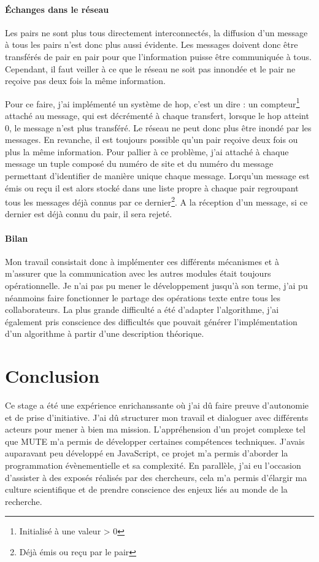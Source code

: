 \documentclass{tnreport}
\begin{document}
\subsubsection{Échanges dans le réseau}
Les pairs ne sont plus tous directement interconnectés, la diffusion d'un message à tous les pairs n'est donc plus aussi évidente. Les messages doivent donc être transférés de pair en pair pour que l'information puisse être communiquée à tous. Cependant, il faut veiller à ce que le réseau ne soit pas innondée et le pair ne reçoive pas deux fois la même information.

Pour ce faire, j'ai implémenté un système de hop, c'est un dire : un compteur\footnote{Initialisé à une valeur > 0} attaché au message, qui est décrémenté à chaque transfert, lorsque le hop atteint 0, le message n'est plus transféré. Le réseau ne peut donc plus être inondé par les messages. En revanche, il est toujours possible qu'un pair reçoive deux fois ou plus la même information. Pour pallier à ce problème, j'ai attaché à chaque message un tuple composé du numéro de site et du numéro du message permettant d'identifier de manière unique chaque message. Lorqu'un message est émis ou reçu il est alors stocké dans une liste propre à chaque pair regroupant tous les messages déjà connus par ce dernier\footnote{Déjà émis ou reçu par le pair}. A la réception d'un message, si ce dernier est déjà connu du pair, il sera rejeté. 

\subsubsection{Bilan}
Mon travail consistait donc à implémenter ces différents mécanismes et à m'assurer que la communication avec les autres modules était toujours opérationnelle. Je n'ai pas pu mener le développement jusqu'à son terme, j'ai pu néanmoins faire fonctionner le partage des opérations texte entre tous les collaborateurs. La plus grande difficulté a été d'adapter l'algorithme, j'ai également pris conscience des difficultés que pouvait générer l'implémentation d'un algorithme à partir d'une description théorique.

\chapter{Conclusion}
Ce stage a été une expérience enrichanssante où j'ai dû faire preuve d'autonomie et de prise d'initiative. J'ai dû structurer mon travail et dialoguer avec différents acteurs pour mener à bien ma mission. L'appréhension d'un projet complexe tel que MUTE m'a permis de développer certaines compétences techniques. J'avais auparavant peu développé en JavaScript, ce projet m'a permis d'aborder la programmation évènementielle et sa complexité. En parallèle, j'ai eu l'occasion d'assister à des exposés réalisés par des chercheurs, cela m'a permis d'élargir ma culture scientifique et de prendre conscience des enjeux liés au monde de la recherche.
\end{document}
